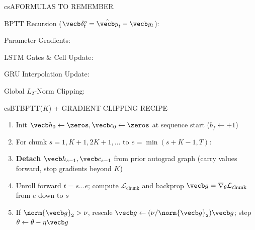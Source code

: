\documentclass[../../../../master.tex]{subfiles}
\begin{document}

\csnextpage

\begin{cscolumns}
\begin{cscard}{csA}{FORMULAS TO REMEMBER}
  \begin{csbul}
    \item BPTT Recursion ($\vecb\delta_t^o = \hat{\vecb y}_t - \vecb y_t$):
    \item Parameter Gradients:
    \item LSTM Gates \& Cell Update:
    \item GRU Interpolation Update:
    \item Global $L_2$-Norm Clipping:
  \end{csbul}
\end{cscard}

\begin{cscard}{csB}{TBPTT($K$) + GRADIENT CLIPPING RECIPE}
  \begin{enumerate}[leftmargin=1.2em, itemsep=1pt, topsep=1pt, parsep=0pt]
    \item Init $\vecb h_0\leftarrow\zeros, \vecb c_0\leftarrow\zeros$ at sequence start ($b_f\leftarrow +1$)
    \item For chunk $s=1, K{+}1, 2K{+}1,\dots$ to $e=\min(s{+}K{-}1,T)$:
    \item \textbf{Detach} $\vecb h_{s-1}, \vecb c_{s-1}$ from prior autograd graph (carry values forward, stop gradients beyond $K$)
    \item Unroll forward $t=s\dots e$; compute $\mathcal L_{\mathrm{chunk}}$ and backprop $\vecb g = \nabla_\theta\mathcal L_{\mathrm{chunk}}$ from $e$ down to $s$
    \item If $\norm{\vecb g}_2 > \nu$, rescale $\vecb g \leftarrow (\nu/\norm{\vecb g}_2)\vecb g$; step $\theta \leftarrow \theta - \eta\vecb g$
  \end{enumerate}
\end{cscard}
\columnbreak


\end{cscolumns}
\end{document}
